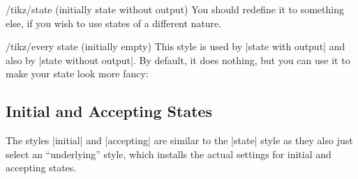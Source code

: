 \begin{stylekey}{/tikz/state (initially state without output)}
  You should redefine it to something else, if you wish to use states
  of a different nature.
\begin{codeexample}[]
\end{codeexample}
\end{stylekey}

\begin{stylekey}{/tikz/every state (initially \normalfont empty)}
  This style is used by |state with output| and also by
  |state without output|. By default, it does nothing, but you can use
  it to make your state look more fancy:
\begin{codeexample}[]
\end{codeexample}
\end{stylekey}


\subsection{Initial and Accepting States}

The styles |initial| and |accepting| are similar to the |state| style
as they also just select an ``underlying'' style, which installs the
actual settings for initial and accepting states.

